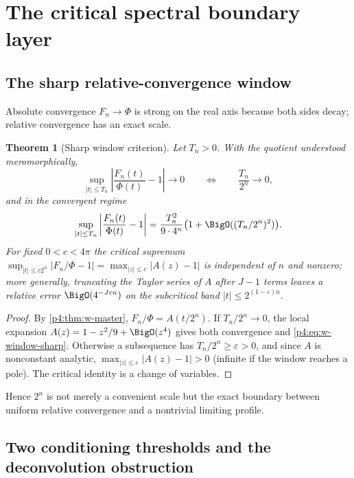 \documentclass[11pt,oneside]{article}
\numberwithin{equation}{section}
\newtheorem{theorem}{Theorem}[section]
\theoremstyle{definition}
\theoremstyle{remark}
\begin{document}
\section{The critical spectral boundary layer}
\label{p4:sec:w-critical}

\subsection{The sharp relative-convergence window}

Absolute convergence $F_n\to\Phi$ is strong on the real axis because both
sides decay; relative convergence has an exact scale.

\begin{theorem}[Sharp window criterion]
\label{p4:thm:w-window}
Let $T_n>0$.  With the quotient understood meromorphically,
\begin{equation}
 \sup_{|t|\le T_n}\left|\frac{F_n(t)}{\Phi(t)}-1\right|\longrightarrow0
 \qquad\Longleftrightarrow\qquad
 \frac{T_n}{2^n}\longrightarrow0,
 \label{p4:eq:w-window-iff}
\end{equation}
and in the convergent regime
\begin{equation}
 \sup_{|t|\le T_n}\left|\frac{F_n(t)}{\Phi(t)}-1\right|
 =\frac{T_n^2}{9\cdot4^n}\bigl(1+\BigO((T_n/2^n)^2)\bigr).
 \label{p4:eq:w-window-sharp}
\end{equation}
For fixed $0<c<4\pi$ the critical supremum
$\sup_{|t|\le c2^n}|F_n/\Phi-1|=\max_{|z|\le c}|A(z)-1|$ is independent of
$n$ and nonzero; more generally, truncating the Taylor series of $A$ after
$J-1$ terms leaves a relative error $\BigO(4^{-J\varepsilon n})$ on the
subcritical band $|t|\le2^{(1-\varepsilon)n}$.
\end{theorem}

\begin{proof}
By \cref{p4:thm:w-master}, $F_n/\Phi=A(t/2^n)$.  If $T_n/2^n\to0$, the local
expansion $A(z)=1-z^2/9+\BigO(z^4)$ gives both convergence and
\eqref{p4:eq:w-window-sharp}.  Otherwise a subsequence has
$T_n/2^n\ge\varepsilon>0$, and since $A$ is nonconstant analytic,
$\max_{|z|\le\varepsilon}|A(z)-1|>0$ (infinite if the window reaches a
pole).  The critical identity is a change of variables.
\end{proof}

Hence $2^n$ is not merely a convenient scale but the exact boundary between
uniform relative convergence and a nontrivial limiting profile.

\subsection{Two conditioning thresholds and the deconvolution obstruction}
\end{document}
